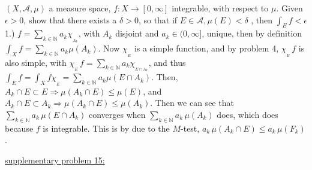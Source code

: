 \documentclass[12pt]{article}
\newcommand{\nats}[0] { \mathbb{N}}
\begin{document}
\begin{flushleft}
$(X,\mathcal A, \mu )$ a measure space, $f:X \rightarrow [0,\infty]$  integrable, with respect to $\mu$. Given $\epsilon > 0$, show that there exists a $\delta > 0$, so that if $E \in \mathcal A, \mu(E)<\delta$ , then $\int_E f < \epsilon$ \\
1.) $f = \sum_{k \in \nats} a_k \chi_{_{A_k}}$, with $A_k$ disjoint and $a_k \in (0,\infty]$, unique, then by definition $\int_X f = \sum_{k \in \nats} a_k \mu({A_k})$. Now $\chi_{_{E}}$ is a simple function, and by problem 4, $\chi_{_{E}} \, f$ is also simple, with $\chi_{_{E}} \,f = \sum_{k \in \nats} a_k \chi_{_{E \cap A_k}}$, and thus $\int_E f = \int_X f \chi_{_{E}}= \sum_{k \in \nats} a_k  \mu(E \cap A_k)$. Then, $A_k \cap E \subset E \Rightarrow \mu(A_k \cap E) \le \mu(E)$, and $A_k \cap E \subset A_k \Rightarrow \mu(A_k \cap E) \le \mu(A_k)$. Then we can see that $\sum_{k \in \nats} a_k \, \mu(E \cap A_k)$ converges when $\sum_{k \in \nats} a_k \, \mu(A_k)$ does, which does because $f$ is integrable. This is by due to the $M$-test, $a_k \, \mu(A_k \cap E ) \le a_k \, \mu(F_k )$. 

\end{flushleft}


\begin{flushleft}
\underline{supplementary problem 15:}
\end{flushleft}
\end{document}
